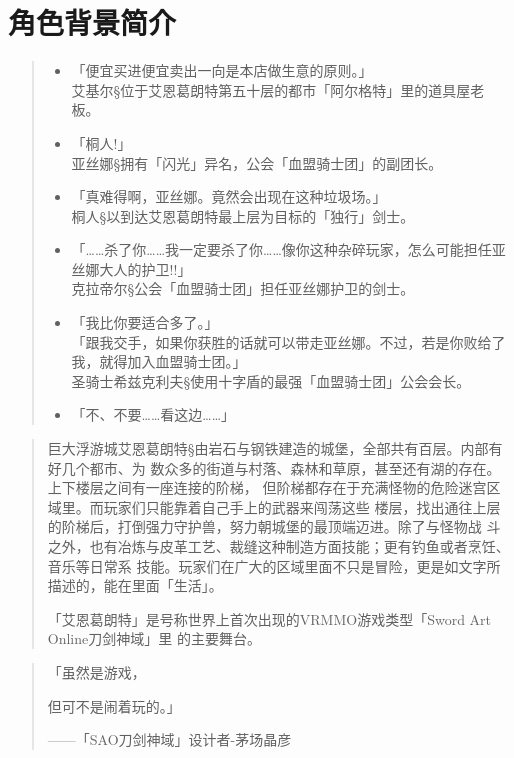 \documentclass[11pt]{book}
\begin{document}
\chapter{角色背景简介}
\label{sec:org508cdd0}
\begin{quote}
\begin{itemize}
\item 「便宜买进便宜卖出一向是本店做生意的原则。」\\
艾基尔§位于艾恩葛朗特第五十层的都市「阿尔格特」里的道具屋老板。

\item 「桐人!」\\
亚丝娜§拥有「闪光」异名，公会「血盟骑士团」的副团长。

\item 「真难得啊，亚丝娜。竟然会出现在这种垃圾场。」\\
桐人§以到达艾恩葛朗特最上层为目标的「独行」剑士。

\item 「……杀了你……我一定要杀了你……像你这种杂碎玩家，怎么可能担任亚丝娜大人的护卫!!」\\
克拉帝尔§公会「血盟骑士团」担任亚丝娜护卫的剑士。

\item 「我比你要适合多了。」\\
「跟我交手，如果你获胜的话就可以带走亚丝娜。不过，若是你败给了我，就得加入血盟骑士团。」\\
 圣骑士希兹克利夫§使用十字盾的最强「血盟骑士团」公会会长。

\item 「不、不要……看这边……」
\end{itemize}
\end{quote}

\begin{quote}
巨大浮游城艾恩葛朗特§由岩石与钢铁建造的城堡，全部共有百层。内部有好几个都市、为
数众多的街道与村落、森林和草原，甚至还有湖的存在。上下楼层之间有一座连接的阶梯，
但阶梯都存在于充满怪物的危险迷宫区域里。而玩家们只能靠着自己手上的武器来闯荡这些
楼层，找出通往上层的阶梯后，打倒强力守护兽，努力朝城堡的最顶端迈进。除了与怪物战
斗之外，也有冶炼与皮革工艺、裁缝这种制造方面技能；更有钓鱼或者烹饪、音乐等日常系
技能。玩家们在广大的区域里面不只是冒险，更是如文字所描述的，能在里面「生活」。

「艾恩葛朗特」是号称世界上首次出现的VRMMO游戏类型「Sword Art Online刀剑神域」里
的主要舞台。
\end{quote}

\begin{quote}
「虽然是游戏，

但可不是闹着玩的。」

——「SAO刀剑神域」设计者-茅场晶彦
\end{quote}
\end{document}
